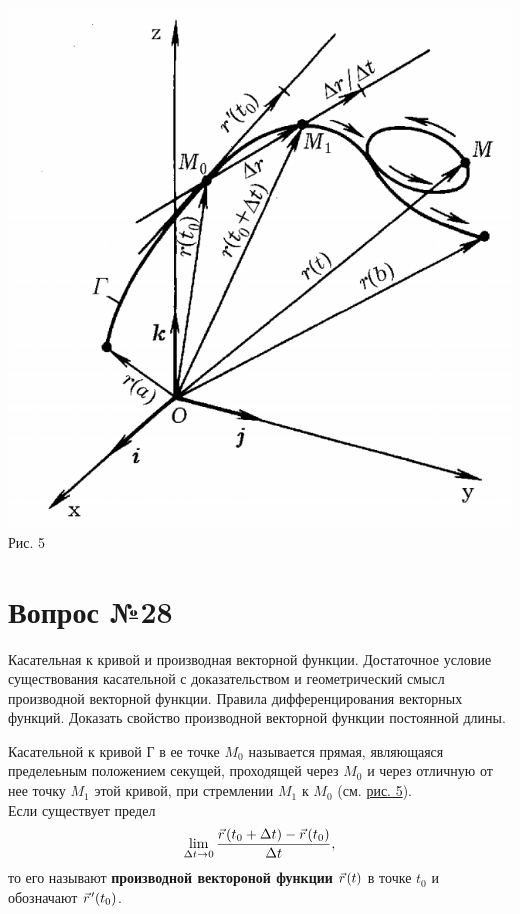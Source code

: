 \documentclass[12pt]{report}
\numberwithin{equation}{section}
\newcommand{\pvec}[1]{\vec{#1}\mkern2mu\vphantom{#1}}
\begin{document}
\begin{center}
\includegraphics[scale=0.4]{pic27_1.png} \label{pic:27:1}\\
Рис. 5
\end{center}

\newpage \section{Вопрос №28} %
\begin{framed}
Касательная к кривой и производная векторной функции. Достаточное условие существования касательной с доказательством и геометрический смысл производной векторной функции. Правила дифференцирования векторных функций. Доказать свойство производной векторной функции постоянной длины.
\end{framed}
Касательной к кривой Г в ее точке $M_0$ называется прямая, являющаяся пределеьным положением секущей, проходящей через $M_0$ и через отличную от нее точку $M_1$ этой кривой, при стремлении $M_1$ к $M_0$ (см. \hyperref[pic:27:1]{рис. 5}).\\

Если существует предел
\[ \lim_{\Delta t \to 0} \frac{\pvec{r}(t_0 + \Delta t) - \pvec{r}(t_0)}{\Delta t},\]
то его называют \textbf{производной вектороной функции} $\pvec{r}(t)$ в точке $t_0$ и обозначают $\pvec{r}'(t_0)$.
\end{document}

